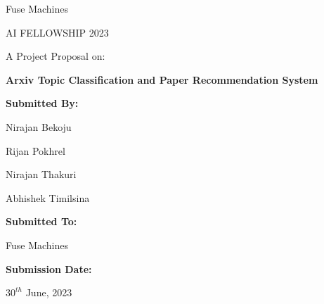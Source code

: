 \bigskip
\bigskip
\bigskip
\bigskip
\bigskip
\bigskip


\begin{center}
    
Fuse Machines 

AI FELLOWSHIP 2023

\bigskip
\bigskip
\bigskip
\bigskip
\bigskip
\bigskip
\noindent\makebox[\linewidth]
{\rule{15cm}{0.4pt}}
A Project Proposal on:

\textbf{Arxiv Topic Classification and Paper Recommendation System}
\noindent\makebox[\linewidth]
{\rule{15cm}{0.4pt}}

\bigskip
\bigskip
\bigskip
\bigskip
\bigskip
\bigskip
\bigskip
\bigskip
\textbf{Submitted By:}

Nirajan Bekoju

Rijan Pokhrel

Nirajan Thakuri

Abhishek Timilsina



\bigskip
\bigskip
\bigskip
\bigskip
\textbf{Submitted To:}

Fuse Machines

\bigskip
\bigskip
\bigskip
\bigskip
\textbf{Submission Date:} 

$30^{th}$ June, 2023

\end{center}

\tableofcontents
\clearpage
\listoffigures
\clearpage
\listoftables
\clearpage